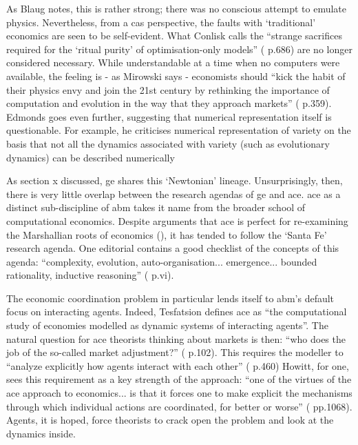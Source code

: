 As Blaug notes, this is rather strong; there was no conscious attempt to emulate physics. Nevertheless, from a \gls{cas} perspective, the faults with `traditional' economics are seen to be self-evident. What Conlisk calls the ``strange sacrifices required for the `ritual purity' of optimisation-only models'' (\citealt{conlisk_why_1996} p.686) are no longer considered necessary. While understandable at a time when no computers were available, the feeling is - as Mirowski says - economists should ``kick the habit of their physics envy and join the 21st century by rethinking the importance of computation and evolution in the way that they approach markets'' (\citealt{mirowski_kicking_2007} p.359). Edmonds goes even further, suggesting that numerical representation itself is questionable. For example, he criticises numerical representation of variety on the basis that not all the dynamics associated with variety (such as evolutionary dynamics) can be described numerically

As section x discussed, \gls{ge} shares this `Newtonian' lineage. Unsurprisingly, then, there is very little overlap between the research agendas of \gls{ge} and \gls{ace}. \gls{ace} as a distinct sub-discipline of \gls{abm} takes it name from the broader school of computational economics. Despite arguments that \gls{ace} is perfect for re-examining the Marshallian roots of economics (\citealt{leijonhufvud_agent-based_2006}), it has tended to follow the `Santa Fe' research agenda. One editorial contains a good checklist of the concepts of this agenda: ``complexity, evolution, auto-organisation... emergence... bounded rationality, inductive reasoning'' (\citealt{consiglio_artificial_2007} p.vi).  

The economic coordination problem in particular lends itself to \gls{abm}'s default focus on interacting agents. Indeed, Tesfatsion defines \gls{ace} as ``the computational study of economies modelled as dynamic systems of interacting agents''. The natural question for \gls{ace} theorists thinking about markets is then: ``who does the job of the so-called market adjustment?'' (\citealt{consiglio_artificial_2007-1} p.102). This requires the modeller to ``analyze explicitly how agents interact with each other'' (\citealt{kirman_evolving_2001} p.460) Howitt, for one, sees this requirement as a key strength of the approach: ``one of the virtues of the \gls{ace} approach to economics... is that it forces one to make explicit the mechanisms through which individual actions are coordinated, for better or worse'' (\citealt{howitt_coordination_2006} pp.1068). Agents, it is hoped, force theorists to crack open the problem and look at the dynamics inside.

